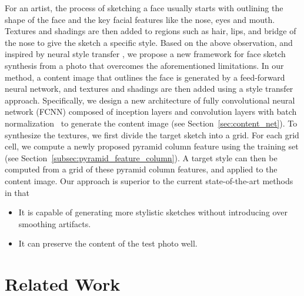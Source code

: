 \documentclass[10pt,twocolumn,letterpaper]{article}
\begin{document}
For an artist, the process of sketching a face usually starts with outlining the shape of the face and the key facial features like the nose, eyes and mouth. Textures and shadings are then added to regions such as hair, lips, and bridge of the nose to give the sketch a specific style. Based on the above observation, and inspired by neural style transfer \cite{gatys2015texture}, we propose a new framework for face sketch synthesis from a  photo that overcomes the aforementioned limitations. In our method, a content image that outlines the face is generated by a feed-forward neural network, and textures and shadings are then added using a style transfer approach. Specifically, we design a new architecture of fully convolutional neural network (FCNN) composed of inception layers \cite{szegedy2015going} and convolution layers with batch normalization~\cite{Sergey2015batch} to generate the content image (see Section~\ref{sec:content_net}). To synthesize the textures, we first divide the target sketch into a grid. For each grid cell, we compute a newly proposed pyramid column feature using the training set (see Section~\ref{subsec:pyramid_feature_column}). A target style can then be computed from a grid of these pyramid column features, and applied to the content image. Our approach is superior to the current state-of-the-art methods in that
\begin{itemize}
\item It is capable of generating more stylistic sketches without introducing over smoothing artifacts.
\item It can preserve the content of the test photo well.
\end{itemize}

\section{Related Work}\label{sec:related_work}
\end{document}
